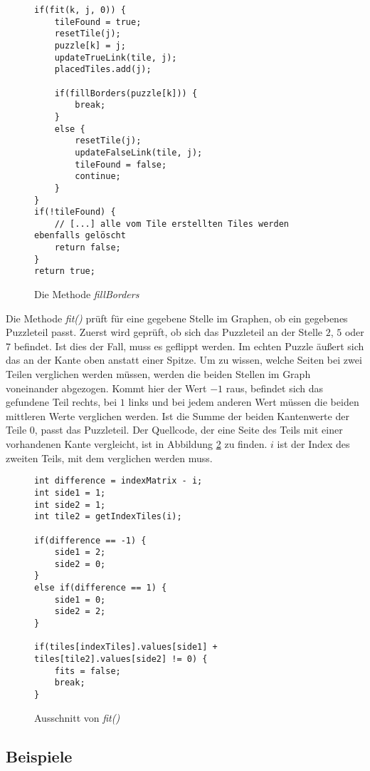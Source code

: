 \documentclass[a4paper, 12pt]{scrartcl}
\begin{document}
\begin{figure}[h]
    \centering

    \begin{lstlisting}
if(fit(k, j, 0)) {
	tileFound = true;
	resetTile(j);
	puzzle[k] = j;
	updateTrueLink(tile, j);
	placedTiles.add(j);
						
	if(fillBorders(puzzle[k])) {
		break;
	}
    else {
		resetTile(j);
		updateFalseLink(tile, j);
		tileFound = false;
	    continue;
    }
}
if(!tileFound) {
    // [...] alle vom Tile erstellten Tiles werden ebenfalls gelöscht
    return false;
}
return true;
    \end{lstlisting}

    \caption{Die Methode \emph{fillBorders}}
    \label{fillBorders}
\end{figure}

Die Methode \emph{fit()} prüft für eine gegebene Stelle im Graphen, ob ein gegebenes Puzzleteil passt. Zuerst wird geprüft, ob sich das Puzzleteil an der Stelle $2$, $5$ oder $7$ befindet. Ist dies der Fall, muss es geflippt werden. Im echten Puzzle äußert sich das an der Kante oben anstatt einer Spitze. Um zu wissen, welche Seiten bei zwei Teilen verglichen werden müssen, werden die beiden Stellen im Graph voneinander abgezogen. Kommt hier der Wert $-1$ raus, befindet sich das gefundene Teil rechts, bei $1$ links und bei jedem anderen Wert müssen die beiden mittleren Werte verglichen werden. Ist die Summe der beiden Kantenwerte der Teile $0$, passt das Puzzleteil. Der Quellcode, der eine Seite des Teils mit einer vorhandenen Kante vergleicht, ist in Abbildung \ref{fit} zu finden. $i$ ist der Index des zweiten Teils, mit dem verglichen werden muss.

\begin{figure}[h]
    \centering
\begin{lstlisting}
int difference = indexMatrix - i;
int side1 = 1;
int side2 = 1;
int tile2 = getIndexTiles(i);
			
if(difference == -1) {
    side1 = 2;
	side2 = 0;
}
else if(difference == 1) {
	side1 = 0;
	side2 = 2;
}	

if(tiles[indexTiles].values[side1] + tiles[tile2].values[side2] != 0) {
    fits = false;
    break;
}
\end{lstlisting}
    \caption{Ausschnitt von \emph{fit()}}
    \label{fit}
\end{figure}

\subsection{Beispiele}
\end{document}

